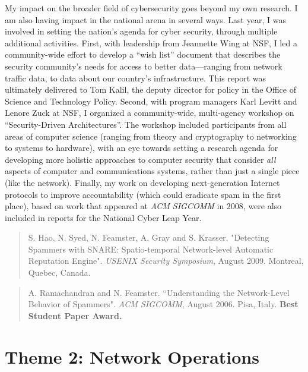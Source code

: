 My impact on the broader field of cybersecurity goes beyond my own
research.  I am also having impact in the national arena in several
ways.  Last year, I was involved in setting the nation's agenda for
cyber security, through multiple additional activities.  First, with
leadership from Jeannette Wing at NSF, I led a community-wide effort to
develop a ``wish list'' document that describes the security community's
needs for access to better data---ranging from network traffic data, to
data about our country's infrastructure.  This report was ultimately
delivered to Tom Kalil, the deputy director for policy in the Office of
Science and Technology Policy.  Second, with program managers Karl
Levitt and Lenore Zuck at NSF, I organized a community-wide,
multi-agency workshop on ``Security-Driven Architectures''.  The
workshop included participants from all areas of computer science
(ranging from theory and cryptography to networking to systems to
hardware), with an eye towards setting a research agenda for developing
more holistic approaches to computer security that consider {\em all}
aspects of computer and communications systems, rather than just a
single piece (like the network).  Finally, my work on developing
next-generation Internet protocols to improve accountability (which
could eradicate spam in the first place), based on work that appeared at
{\em ACM SIGCOMM} in 2008, were also included in reports for the
National Cyber Leap Year.

\begin{quote}
S. Hao, N. Syed, N. Feamster, A. Gray and S. Krasser. "Detecting
Spammers with SNARE: Spatio-temporal Network-level Automatic Reputation
Engine". {\em USENIX Security Symposium}, August 2009. Montreal, Quebec,
Canada. 
\end{quote}

\begin{quote}
A. Ramachandran and N. Feamster. ``Understanding the Network-Level
Behavior of Spammers". {\em ACM SIGCOMM}, August 2006. Pisa, Italy. {\bf
Best Student Paper Award.}
\end{quote}



\section*{Theme 2: Network Operations}

